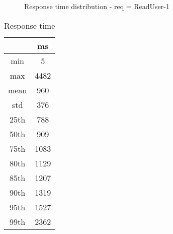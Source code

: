 \begin{minipage}{0.75\linewidth}
\begin{figure}[h]
\begin{adjustbox}{max width=1.0\linewidth, keepaspectratio}
  \end{adjustbox}
  \caption{Response time distribution - req = ReadUser-1}
\end{figure}
\end{minipage}\hfill\begin{minipage}{0.18\linewidth}
\begin{table}[h]
\begin{tabular}{|cc|}
\hline
\textbf{} & \textbf{ms}\\ \hline
 \Xhline{0.005\arrayrulewidth}
min & 5\\
 \Xhline{0.005\arrayrulewidth}
max & 4482\\
 \Xhline{0.005\arrayrulewidth}
mean & 960\\
 \Xhline{0.005\arrayrulewidth}
std & 376\\
\hline
\hline
 \Xhline{0.005\arrayrulewidth}
25th & 788\\
 \Xhline{0.005\arrayrulewidth}
50th & 909\\
 \Xhline{0.005\arrayrulewidth}
75th & 1083\\
 \Xhline{0.005\arrayrulewidth}
80th & 1129\\
 \Xhline{0.005\arrayrulewidth}
85th & 1207\\
 \Xhline{0.005\arrayrulewidth}
90th & 1319\\
 \Xhline{0.005\arrayrulewidth}
95th & 1527\\
 \Xhline{0.005\arrayrulewidth}
99th & 2362\\
\hline
\end{tabular}
\caption{Response time}
\end{table}
\end{minipage}\hfill
